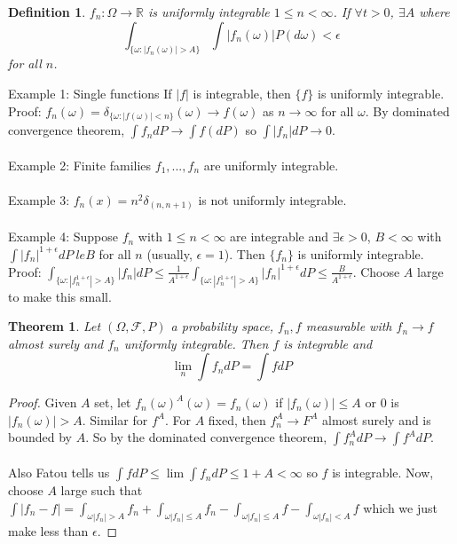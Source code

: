 \documentclass[12pt]{article}
\newtheorem{theorem}{Theorem}
\newtheorem{defn}{Definition}
\begin{document}
\begin{defn}
$f_n: \Omega \rightarrow \mathbb{R}$ is uniformly integrable $1 \le n < \infty$.  If $\forall t > 0$, $\exists A$ where $$\int_{\{\omega : |f_n(\omega) | > A\}} \int |f_n(\omega) | P(d \omega) < \epsilon$$ for all $n$.
\end{defn}
Example 1: Single functions If $|f|$ is integrable, then $\{f \}$ is uniformly integrable.  Proof: $f_n(\omega) = \delta_{\{ \omega : |f(\omega)| < n \}}(\omega) \rightarrow f(\omega)$ as $n \to \infty$ for all $\omega$.  By dominated convergence theorem, $\int f_n dP \rightarrow \int f (dP)$ so $\int |f_n| dP \rightarrow 0$.
\\ \\
Example 2: Finite families $f_1, ..., f_n$ are uniformly integrable.
\\ \\
Example 3: $f_n(x) = n^2 \delta_{(n, n+1)}$ is not uniformly integrable.
\\ \\
Example 4: Suppose $f_n$ with $1 \le n < \infty$ are integrable and $\exists \epsilon > 0$, $B < \infty$ with $\int |f_n|^{1+\epsilon} dP\ le B$ for all $n$ (usually, $\epsilon = 1$).  Then $\{ f_n\}$ is uniformly integrable.  Proof: $\int_{\{ \omega : |f_n^{1+\epsilon}| > A \}} | f_n | dP  \le \frac{1}{A^{1+\epsilon}} \int_{\{ \omega : |f_n^{1+\epsilon}| > A \}} |f_n|^{1+\epsilon} dP \le \frac{B}{A^{1+\epsilon}}$.  Choose $A$ large to make this small.

\begin{theorem}
Let $(\Omega, \mathcal{F}, P)$ a probability space, $f_n, f$ measurable with $f_n \to f$ almost surely and $f_n$ uniformly integrable.  Then $f$ is integrable and
$$\lim_n \int f_n d P = \int f d P$$
\end{theorem}
\begin{proof}
Given $A$ set, let $f_n(\omega)^A (\omega) = f_n(\omega)$ if $|f_n(\omega)| \le A$ or $0$ is $|f_n(\omega) | > A$.  Similar for $f^A$.  For $A$ fixed, then $f_n^A \to F^A$ almost surely and is bounded by $A$.  So by the dominated convergence theorem, $\int f_n^A d P \rightarrow \int f^A d P$.
\\ \\
Also Fatou tells us $\int f dP \le \lim \int f_n dP \le 1 + A < \infty$ so $f$ is integrable.  Now, choose $A$ large such that $\int |f_n - f| = \int_{\omega |f_n| > A} f_n + \int_{\omega |f_n| \le A} f_n - \int_{\omega |f_n| \le A} f - \int_{\omega |f_n| < A} f$
which we just make less than $\epsilon$.
\end{proof}
\end{document}
